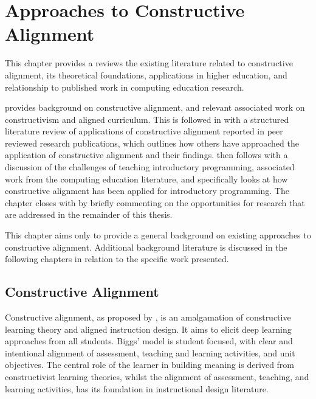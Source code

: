 
\chapter{Approaches to Constructive Alignment} %
\label{cha:background}

\graphicspath{{Figures/Background/}}

This chapter provides a reviews the existing literature related to constructive alignment, its theoretical foundations, applications in higher education, and relationship to published work in computing education research. 

 provides background on constructive alignment, and relevant associated work on constructivism and aligned curriculum. This is followed in  with a structured literature review of applications of constructive alignment reported in peer reviewed research publications, which outlines how others have approached the application of constructive alignment and their findings.  then follows with a discussion of the challenges of teaching introductory programming, associated work from the computing education literature, and specifically looks at how constructive alignment has been applied for introductory programming. The chapter closes with  by briefly commenting on the opportunities for research that are addressed in the remainder of this thesis.

This chapter aims only to provide a general background on existing approaches to constructive alignment. Additional background literature is discussed in the following chapters in relation to the specific work presented. 


\section{Constructive Alignment} %
\label{sec:constructive_alignment}

Constructive alignment, as proposed by \citet{Biggs:1996c}, is an amalgamation of constructive learning theory and aligned instruction design. It aims to elicit deep learning approaches from all students. Biggs' model is student focused, with clear and intentional alignment of assessment, teaching and learning activities, and unit objectives. The central role of the learner in building meaning is derived from constructivist learning theories, whilst the alignment of assessment, teaching, and learning activities, has its foundation in instructional design literature. 

